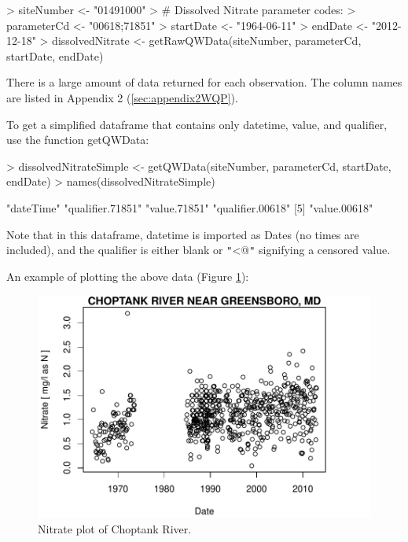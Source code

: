 \documentclass[a4paper,11pt]{article}
\begin{document}
\begin{Schunk}
\begin{Sinput}
> siteNumber <- "01491000" 
> # Dissolved Nitrate parameter codes:
> parameterCd <- "00618;71851"  
> startDate <- "1964-06-11"
> endDate <- "2012-12-18"
> dissolvedNitrate <- getRawQWData(siteNumber, parameterCd, 
       startDate, endDate)
\end{Sinput}
\end{Schunk}

There is a large amount of data returned for each observation. The column names are listed in Appendix 2 (\ref{sec:appendix2WQP}).

To get a simplified dataframe that contains only datetime, value, and qualifier, use the function getQWData:

\begin{Schunk}
\begin{Sinput}
> dissolvedNitrateSimple <- getQWData(siteNumber, parameterCd, 
         startDate, endDate)
> names(dissolvedNitrateSimple)
\end{Sinput}
\begin{Soutput}
[1] "dateTime"        "qualifier.71851" "value.71851"     "qualifier.00618"
[5] "value.00618"    
\end{Soutput}
\end{Schunk}
Note that in this dataframe, datetime is imported as Dates (no times are included), and the qualifier is either blank or \texttt{"}\verb@<@\texttt{"} signifying a censored value.

An example of plotting the above data (Figure \ref{fig:nitrate}):

\begin{Schunk}
\end{Schunk}

\begin{figure}
\begin{center}
\includegraphics{dataRetrieval-fig3}
\end{center}
\caption{Nitrate plot of Choptank River.}
\label{fig:nitrate}
\end{figure}
\end{document}
